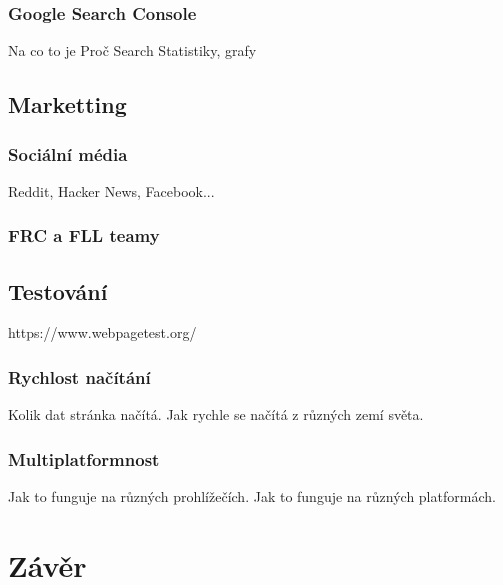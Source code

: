 \documentclass[a4paper, 12pt]{article}
\begin{document}
  \subsubsection{Google Search Console}
  Na co to je
  Proč Search
  Statistiky, grafy

  \subsection{Marketting}

  \subsubsection{Sociální média}
  Reddit, Hacker News, Facebook...

  \subsubsection{FRC a FLL teamy}

  \subsection{Testování}
  https://www.webpagetest.org/

  \subsubsection{Rychlost načítání}
  Kolik dat stránka načítá.
  Jak rychle se načítá z různých zemí světa.

  \subsubsection{Multiplatformnost}
  Jak to funguje na různých prohlížečích.
  Jak to funguje na různých platformách.

  \section{Závěr}
\end{document}
